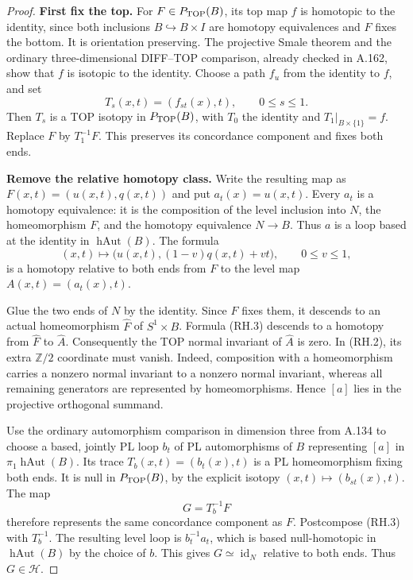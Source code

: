 \begin{proof}
\textbf{First fix the top.}\quad
For $F\in P_{\rm TOP}(B)$, its top map $f$ is homotopic to the
identity, since both inclusions $B\hookrightarrow B\times I$ are
homotopy equivalences and $F$ fixes the bottom. It is orientation
preserving. The projective Smale theorem and the ordinary
three-dimensional DIFF--TOP comparison, already checked in A.162,
show that $f$ is isotopic to the identity. Choose a path $f_u$ from
the identity to $f$, and set
\[
 T_s(x,t)=(f_{st}(x),t),\qquad 0\le s\le1.
\]
Then $T_s$ is a TOP isotopy in $P_{\rm TOP}(B)$, with $T_0$ the
identity and $T_1|_{B\times\{1\}}=f$. Replace $F$ by $T_1^{-1}F$.
This preserves its concordance component and fixes both ends.

\textbf{Remove the relative homotopy class.}\quad
Write the resulting map as $F(x,t)=(u(x,t),q(x,t))$ and put
$a_t(x)=u(x,t)$. Every $a_t$ is a homotopy equivalence: it is the
composition of the level inclusion into $N$, the homeomorphism $F$,
and the homotopy equivalence $N\to B$. Thus $a$ is a loop based at
the identity in $\operatorname{hAut}(B)$. The formula
\[
 (x,t)\longmapsto\bigl(u(x,t),(1-v)q(x,t)+vt\bigr),
       \qquad 0\le v\le1,
 \tag{RH.3}
\]
is a homotopy relative to both ends from $F$ to the level map
$A(x,t)=(a_t(x),t)$.

Glue the two ends of $N$ by the identity. Since $F$ fixes them,
it descends to an actual homeomorphism $\widehat F$ of $S^1\times B$.
Formula (RH.3) descends to a homotopy from $\widehat F$ to
$\widehat A$. Consequently the TOP normal invariant of
$\widehat A$ is zero. In (RH.2), its extra $\mathbb Z/2$ coordinate
must vanish. Indeed, composition with a homeomorphism carries a
nonzero normal invariant to a nonzero normal invariant, whereas
all remaining generators are represented by homeomorphisms.
Hence $[a]$ lies in the projective orthogonal summand.

Use the ordinary automorphism comparison in dimension three from
A.134 to choose a based, jointly PL loop $b_t$ of PL automorphisms
of $B$ representing $[a]$ in $\pi_1\operatorname{hAut}(B)$.
Its trace $T_b(x,t)=(b_t(x),t)$ is a PL homeomorphism fixing both
ends. It is null in $P_{\rm TOP}(B)$, by the explicit isotopy
$(x,t)\mapsto(b_{st}(x),t)$. The map
\[
             G=T_b^{-1}F
\]
therefore represents the same concordance component as $F$.
Postcompose (RH.3) with $T_b^{-1}$. The resulting level loop is
$b_t^{-1}a_t$, which is based null-homotopic in
$\operatorname{hAut}(B)$ by the choice of $b$. This gives
$G\simeq\operatorname{id}_N$ relative to both ends. Thus $G\in\mathcal H$.


\end{proof}
